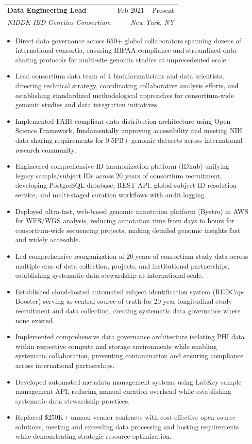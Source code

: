 \documentclass[letterpaper,11pt]{article}
\makeatletter
\newcommand{\resumeItem}[1]{
  \item\small{
    {#1 \vspace{-2pt}}
  }
}
\newcommand{\resumeSubheading}[4]{
  \vspace{-2pt}\item
    \begin{tabular*}{0.97\textwidth}[t]{l@{\extracolsep{\fill}}r}
      \textbf{#1} & #2 \\
      \textit{\small#3} & \textit{\small #4} \\
    \end{tabular*}\vspace{-7pt}
}
\newcommand{\resumeItemListStart}{\begin{itemize}}
\newcommand{\resumeItemListEnd}{\end{itemize}\vspace{-5pt}}
\makeatother
\begin{document}
    \resumeSubheading
      {Data Engineering Lead}{Feb 2021 -- Present}
      {NIDDK IBD Genetics Consortium}{New York, NY}
      \resumeItemListStart
        \resumeItem{Direct data governance across 650+ global collaborators spanning dozens of international consortia, ensuring HIPAA compliance and streamlined data sharing protocols for multi-site genomic studies at unprecedented scale.}
        \resumeItem{Lead consortium data team of 4 bioinformaticians and data scientists, directing technical strategy, coordinating collaborative analysis efforts, and establishing standardized methodological approaches for consortium-wide genomic studies and data integration initiatives.}
        \resumeItem{Implemented FAIR-compliant data distribution architecture using Open Science Framework, fundamentally improving accessibility and meeting NIH data sharing requirements for 0.5PB+ genomic datasets across international research community.}
        \resumeItem{Engineered comprehensive ID harmonization platform (IDhub) unifying legacy sample/subject IDs across 20 years of consortium recruitment, developing PostgreSQL database, REST API, global subject ID resolution service, and multi-staged curation workflows with audit logging.}
        \resumeItem{Deployed ultra-fast, web-based genomic annotation platform (Bystro) in AWS for WES/WGS analysis, reducing annotation time from days to hours for consortium-wide sequencing projects, making detailed genomic insights fast and widely accessible.}
        \resumeItem{Led comprehensive reorganization of 20 years of consortium study data across multiple eras of data collection, projects, and institutional partnerships, establishing systematic data stewardship at international scale.}
        \resumeItem{Established cloud-hosted automated subject identification system (REDCap-Booster) serving as central source of truth for 20-year longitudinal study recruitment and data collection, creating systematic data governance where none existed.}
        \resumeItem{Implemented comprehensive data governance architecture isolating PHI data within respective compute and storage environments while enabling systematic collaboration, preventing contamination and ensuring compliance across international partnerships.}
        \resumeItem{Developed automated metadata management systems using LabKey sample management API, reducing manual curation overhead while establishing systematic data stewardship practices.}
        \resumeItem{Replaced \$250K+ annual vendor contracts with cost-effective open-source solutions, meeting and exceeding data processing and hosting requirements while demonstrating strategic resource optimization.}
      \resumeItemListEnd
\end{document}
